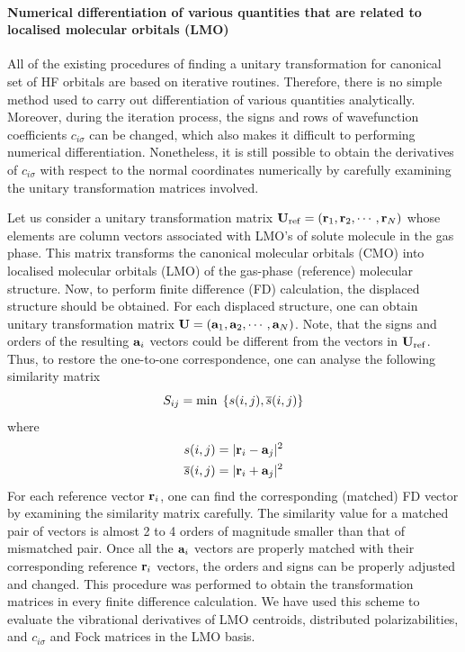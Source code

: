 \documentclass[b5paper,oneside,fleqn,11pt]{book}
\begin{document}
\begin{appendices}
\begin{refsection}
\paragraph{Numerical differentiation of various quantities that are related to localised
molecular orbitals (LMO)}

All of the existing procedures of finding a unitary transformation for canonical set of HF
orbitals are based on iterative routines. Therefore, there is no simple method used to carry out
differentiation of various quantities analytically. Moreover, during the iteration process, the
signs and rows of wavefunction coefficients $c_{i\sigma}$ can be changed, which also makes it difficult
to performing numerical differentiation. Nonetheless, it is still possible to obtain the
derivatives of $c_{i\sigma}$ with respect to the normal coordinates numerically by carefully examining
the unitary transformation matrices involved.

Let us consider a unitary transformation matrix 
${\bf U}_{\rm ref}=\left({\bf r}_1, {\bf r}_2, \cdots, {\bf r}_N\right)$ whose elements
are column vectors associated with LMO's of solute molecule in the gas phase. This matrix
transforms the canonical molecular orbitals (CMO) into localised molecular orbitals (LMO)
of the gas\hyp{}phase (reference) molecular structure. Now, to perform finite difference (FD)
calculation, the displaced structure should be obtained. For each displaced structure, one can
obtain unitary transformation matrix ${\bf U}=\left({\bf a}_1, {\bf a}_2, \cdots, {\bf a}_N\right)$.
Note, that the signs and orders of
the resulting ${\bf a}_i$ vectors could be different from the vectors in ${\bf U}_{\rm ref}$. 
Thus, to restore the one\hyp{}to\hyp{}one
correspondence, one can analyse the following similarity matrix
%
\begin{equation}  \label{e:smin-lmo}
S_{ij} = {\rm min}\;\left\{ s(i,j), \overline{s}(i,j)\right\}
\end{equation}
%
where
%
\begin{subequations}  
\begin{align}
 s(i,j)            &= \lvert {\bf r}_i - {\bf a}_j\rvert^2\\
 \overline{s}(i,j) &= \lvert {\bf r}_i + {\bf a}_j\rvert^2
\end{align}
\end{subequations}
%
For each reference vector ${\bf r}_i$, one can find the corresponding (matched) FD vector by
examining the similarity matrix carefully. The similarity value for a matched pair of vectors is
almost 2 to 4 orders of magnitude smaller than that of mismatched pair. Once all the ${\bf a}_i$ vectors
are properly matched with their corresponding reference ${\bf r}_i$ vectors, the orders and signs can
be properly adjusted and changed. This procedure was performed to obtain the transformation
matrices in every finite difference calculation. We have used this scheme to evaluate the
vibrational derivatives of LMO centroids, distributed polarizabilities, and $c_{i\sigma}$ and Fock
matrices in the LMO basis.



\end{refsection}
\end{appendices}
\end{document}
